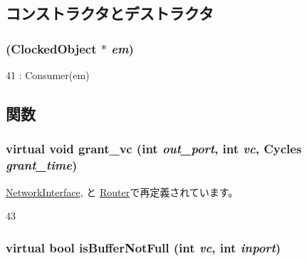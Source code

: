 \subsection{コンストラクタとデストラクタ}
\hypertarget{classFlexibleConsumer_a1de35851711ba03b6671e2a06929fc1c}{
\subsubsection[{FlexibleConsumer}]{ ({\bf ClockedObject} $\ast$ {\em em})}}
\label{classFlexibleConsumer_a1de35851711ba03b6671e2a06929fc1c}



\begin{DoxyCode}
41 : Consumer(em) {}
\end{DoxyCode}


\subsection{関数}
\hypertarget{classFlexibleConsumer_a775e8414113748731990f3979cdd4632}{
\subsubsection[{grant\_\-vc}]{\setlength{\rightskip}{0pt plus 5cm}virtual void grant\_\-vc (int {\em out\_\-port}, \/  int {\em vc}, \/  {\bf Cycles} {\em grant\_\-time})}}
\label{classFlexibleConsumer_a775e8414113748731990f3979cdd4632}


\hyperlink{classNetworkInterface_af90fb6c473130244fe64e30e61b714f6}{NetworkInterface}, と \hyperlink{classRouter_af90fb6c473130244fe64e30e61b714f6}{Router}で再定義されています。


\begin{DoxyCode}
43 {}
\end{DoxyCode}
\hypertarget{classFlexibleConsumer_aa3732d20c1f3f94fb27ef60ac660f363}{
\subsubsection[{isBufferNotFull}]{\setlength{\rightskip}{0pt plus 5cm}virtual bool isBufferNotFull (int {\em vc}, \/  int {\em inport})}}
\label{classFlexibleConsumer_aa3732d20c1f3f94fb27ef60ac660f363}


